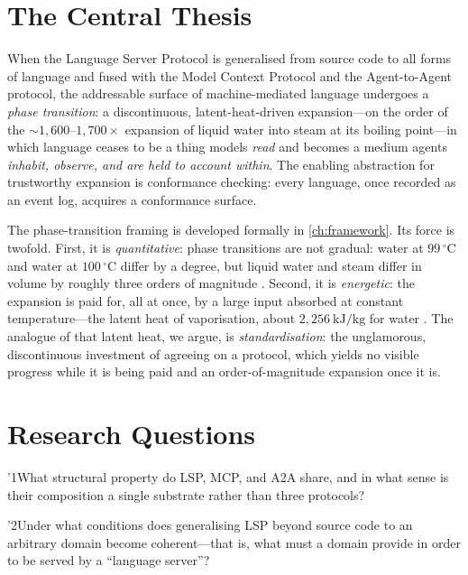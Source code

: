 \section{The Central Thesis}
\label{sec:thesis-statement}

\begin{hypothesis}
\label{hyp:central}
When the Language Server Protocol is generalised from source code to all forms of
language and fused with the Model Context Protocol and the Agent-to-Agent
protocol, the addressable surface of machine-mediated language undergoes a
\emph{phase transition}: a discontinuous, latent-heat-driven expansion---on the
order of the ${\sim}1{,}600$--$1{,}700\times$ expansion of liquid water into
steam at its boiling point---in which language ceases to be a thing models
\emph{read} and becomes a medium agents \emph{inhabit, observe, and are held to
account within}. The enabling abstraction for trustworthy expansion is
conformance checking: every language, once recorded as an event log, acquires a
conformance surface.
\end{hypothesis}

The phase-transition framing is developed formally in \cref{ch:framework}. Its
force is twofold. First, it is \emph{quantitative}: phase transitions are not
gradual: water at $99\,^{\circ}\mathrm{C}$ and water at $100\,^{\circ}\mathrm{C}$
differ by a degree, but liquid water and steam differ in volume by roughly three
orders of magnitude \citep{phys-illinois-steam,nationalboard-steam}. Second, it
is \emph{energetic}: the expansion is paid for, all at once, by a large input
absorbed at constant temperature---the latent heat of vaporisation, about
$2{,}256\ \mathrm{kJ/kg}$ for water \citep{latentheat-openstax}. The analogue of
that latent heat, we argue, is \emph{standardisation}: the unglamorous,
discontinuous investment of agreeing on a protocol, which yields no visible
progress while it is being paid and an order-of-magnitude expansion once it is.

\section{Research Questions}
\label{sec:rqs}

\rq{1}{What structural property do LSP, MCP, and A2A share, and in what sense is
their composition a single substrate rather than three protocols?}

\rq{2}{Under what conditions does generalising LSP beyond source code to an
arbitrary domain become coherent---that is, what must a domain provide in order
to be served by a ``language server''?}

